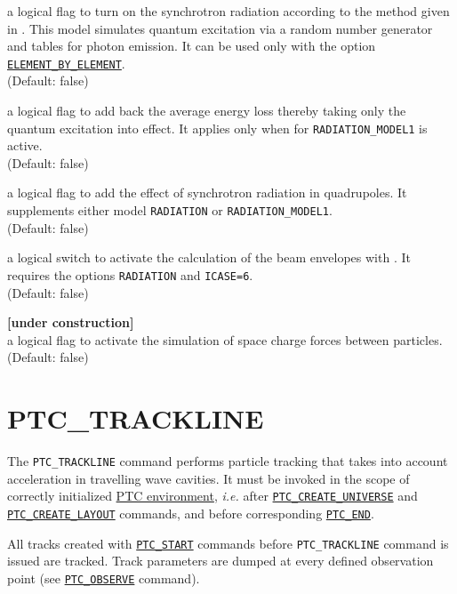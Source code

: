 \begin{madlist}
    a logical flag to turn on the synchrotron
   radiation according to the method given in \cite{roy1990}. This model
   simulates quantum excitation via a random number generator and tables
   for photon emission. It can be used only with the option
   \hyperref[opt:element-by-element]{\texttt{ELEMENT\_BY\_ELEMENT}}.\\ 
   (Default: false) 

    a logical flag to add back the
   average energy loss thereby taking only the quantum excitation into
   effect. It applies only when for \texttt{RADIATION\_MODEL1} is
   active.\\
   (Default: false)

    a logical flag to add the effect of
   synchrotron radiation in quadrupoles. It supplements either model
   \texttt{RADIATION} or \texttt{RADIATION\_MODEL1}. \\
   (Default: false)

    a logical switch to activate the calculation
   of the beam envelopes with \ptc. It requires the options
   \texttt{RADIATION} and \texttt{ICASE=6}.\\
   (Default: false)

    \textbf{[under construction]}\\
     a logical flag to activate the simulation of space charge forces
     between particles. \\ (Default: false)  
\end{madlist}


\section{PTC\_TRACKLINE}
\label{sec:ptc-trackline}

The \texttt{PTC\_TRACKLINE} command performs particle tracking that takes
into account acceleration in travelling wave cavities. 
It must be invoked in the scope of correctly initialized
\hyperref[chap:ptc-setup]{PTC environment}, \textsl{i.e.} after
\hyperref[sec:ptc-create-universe]{\texttt{PTC\_CREATE\_UNIVERSE}} 
and \hyperref[sec:ptc-create-layout]{\texttt{PTC\_CREATE\_LAYOUT}} commands, and before
corresponding \hyperref[sec:ptc-end]{\texttt{PTC\_END}}. 

All tracks created with \hyperref[sec:ptc-start]{\texttt{PTC\_START}}
commands before \texttt{PTC\_TRACKLINE} command is issued are 
tracked. Track parameters are dumped at every defined observation point
(see \hyperref[sec:ptc-observe]{\texttt{PTC\_OBSERVE}} command). 


